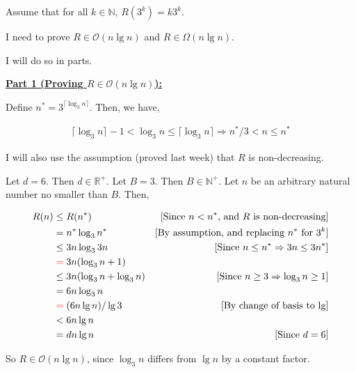 \documentclass[12pt]{article}
\begin{document}
\begin{itemize}
\begin{mdframed}
    Assume that for all $k \in \mathbb{N}$, $R(3^k) = k3^k$.

    \bigskip

    I need to prove $R \in \mathcal{O}(n \lg n)$ and $R \in \Omega(n \lg n)$.

    \bigskip

    I will do so in parts.

    \bigskip

    \underline{\textbf{Part 1 (Proving $R \in \mathcal{O}(n \lg n)$):}}

    \bigskip

    Define $n^* = 3^{\lceil \log_3 n \rceil}$. Then, we have,

    \begin{align}
        \lceil \log_3 n \rceil - 1 < \log_3 n \leq \lceil \log_3 n \rceil \Rightarrow n^*/3 < n \leq n^*
    \end{align}

    I will also use the assumption (proved last week) that $R$ is non-decreasing.

    \bigskip

    Let $d = 6$. Then $d \in \mathbb{R}^+$. Let $B = 3$. Then $B \in \mathbb{N}^+$. Let
    $n$ be an arbitrary natural number no smaller than $B$. Then,

    \bigskip

    \begin{align}
    R(n) &\leq R(n^*)  & [\text{Since $n < n^*$, and $R$ is non-decreasing}]\\
    &= n^* \log_3 n^* & [\text{By assumption, and replacing $n^*$ for $3^k$}]\\
    &\leq 3n \log_3 3n  & [\text{Since $n \leq n^* \Rightarrow 3n \leq 3n^*$}]\\
    &\color{red}=\color{black} 3n(\log_3 n + 1)\\
    &\leq 3n(\log_3 n + \log_3 n) & [\text{Since $n \geq 3 \Rightarrow \log_3 n \geq 1$}]\\
    &= 6n \log_3 n\\
    &\color{red}=\color{black} (6n \lg n)/\lg 3 & [\text{By change of basis to $\lg$}]\\
    &< 6n \lg n\\
    &= dn \lg n & [\text{Since $d = 6$}]
    \end{align}

    \bigskip

    So $R \in \mathcal{O}(n \lg n)$, since $\log_3 n$ differs from $\lg n$ by a constant factor.


\end{mdframed}
\end{itemize}
\end{document}
